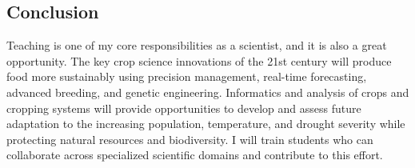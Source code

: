 \documentclass[english]{tufte-handout}
\begin{document}
\begin{fullwidth}
\section{Conclusion}

Teaching is one of my core responsibilities as a scientist, and it is also a great opportunity.
 The key crop science innovations of the 21st century will produce food more sustainably using precision management, real-time forecasting, advanced breeding, and genetic engineering.
 Informatics and analysis of crops and cropping systems will provide opportunities to develop and assess future adaptation to the increasing population, temperature, and drought severity while protecting natural resources and biodiversity.
 I will train students who can collaborate across specialized scientific domains and contribute to this effort.

\end{fullwidth}
\end{document}

